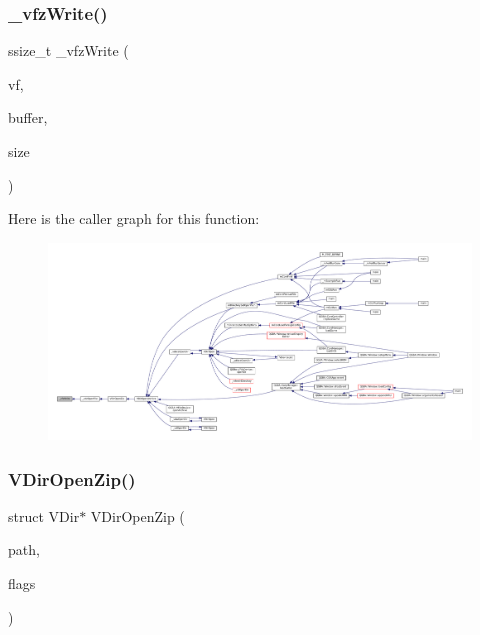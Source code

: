 \subsubsection{\texorpdfstring{\+\_\+vfz\+Write()}{\_vfzWrite()}}
{\footnotesize\ttfamily ssize\+\_\+t \+\_\+vfz\+Write (\begin{DoxyParamCaption}\item[{struct V\+File $\ast$}]{vf,  }\item[{const void $\ast$}]{buffer,  }\item[{size\+\_\+t}]{size }\end{DoxyParamCaption})\hspace{0.3cm}{\ttfamily [static]}}

Here is the caller graph for this function\+:
\nopagebreak
\begin{figure}[H]
\begin{center}
\leavevmode
\includegraphics[width=350pt]{vfs-zip_8c_aa2e7a8e1946bc438fc2cd474533b9e56_icgraph}
\end{center}
\end{figure}
\mbox{\label{vfs-zip_8c_a0107bc6e3321e3c0ebf36b9a27cfa452}} 
\subsubsection{\texorpdfstring{V\+Dir\+Open\+Zip()}{VDirOpenZip()}}
{\footnotesize\ttfamily struct V\+Dir$\ast$ V\+Dir\+Open\+Zip (\begin{DoxyParamCaption}\item[{const char $\ast$}]{path,  }\item[{\mbox{\hyperlink{ioapi_8h_a787fa3cf048117ba7123753c1e74fcd6}{int}}}]{flags }\end{DoxyParamCaption})}

